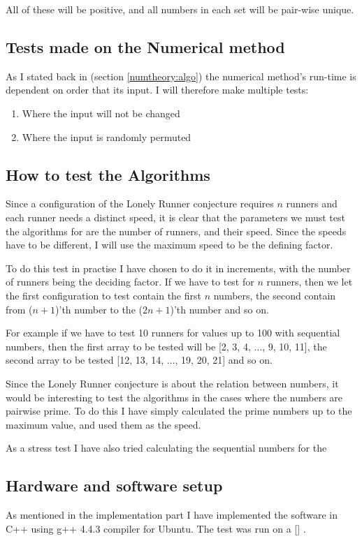 All of these will be positive, and all numbers in each set will be
pair-wise unique.




\subsection{Tests made on the Numerical method}
As I stated back in (section \ref{numtheory:algo}) the numerical
method's run-time is dependent on order that its input. I will
therefore make multiple tests:
\begin{enumerate}
\item Where the input will not be changed
\item Where the input is randomly permuted
\end{enumerate} 

\subsection{How to test the Algorithms}
Since a configuration of the Lonely Runner conjecture requires $n$ runners and each runner needs a distinct speed, it is clear that the parameters we must test the algorithms for are the number of runners, and their speed. Since the speeds have to be different, I will use the maximum speed to be the defining factor.

To do this test in practise I have chosen to do it in increments, with the number of runners being the deciding factor. If we have to test for $n$ runners, then we let the first configuration to test contain the first $n$ numbers, the second contain from ($n+1$)'th number to the ($2n+1$)'th number and so on.

For example if we have to test 10 runners for values up to 100 with sequential numbers, then the first array to be tested will be [2, 3, 4, $\ldots$, 9, 10, 11], the second array to be tested [12, 13, 14, $\ldots$, 19, 20, 21] and so on.

Since the Lonely Runner conjecture is about the relation between numbers, it would be interesting to test the algorithms in the cases where the numbers are pairwise prime. To do this I have simply calculated the prime numbers up to the maximum value, and used them as the speed.

As a stress test I have also tried calculating the sequential numbers for the 

\subsection{Hardware and software setup}
As mentioned in the implementation part I have implemented the software in C++ using g++ 4.4.3 compiler for Ubuntu. The test was run on a [] .


